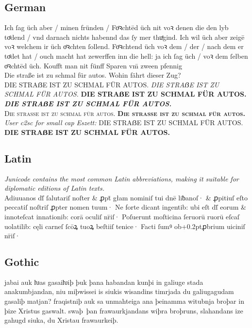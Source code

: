 \documentclass[12pt,a4paper,openany]{book}
\newcommand{\saltb}[1]{{\addfontfeatures{Alternate=1}{#1}}}
\begin{document}
\subsection*{German}

Ich ſag üch aber / minen fründen / Foͤꝛchtēd üch nit voꝛ denen die den
lyb toͤdend / vnd darnach nichts habennd das ſy mer thuͤgind. Ich wil
üch aber zeigē voꝛ welchem ir üch \saltb{f}oͤꝛchten ſollend. Foͤꝛchtend üch voꝛ
dem / der / nach dem er toͤdet hat / ouch macht hat zewerffen inn die
hell: ja ich ſag üch / voꝛ dem ſelben \saltb{f}oͤꝛchtēd üch. Koufft man nit
fünff Sparen vm̄ zween pfennig\\[1ex]
{\Large Die straße ist zu schmal für autos. Wohin fährt dieser Zug?}\\
DIE STRAẞE IST ZU SCHMAL FÜR AUTOS.
{\itshape DIE STRAẞE IST ZU SCHMAL FÜR AUTOS.}
{\bfseries DIE STRAẞE IST ZU SCHMAL FÜR AUTOS.}
{\itshape\bfseries DIE STRAẞE IST ZU SCHMAL FÜR AUTOS.}\\[1ex]
{\scshape Die straße ist zu schmal für autos.
\bfseries Die straße ist zu schmal für autos.}
{\itshape User c2sc for small cap Eszett:}
{DIE STRAẞE IST ZU SCHMAL FÜR AUTOS.
\bfseries DIE STRAẞE IST ZU SCHMAL FÜR AUTOS.}



\subsection*{Latin}

{\small\itshape Junicode contains the most common Latin abbreviations,
  making it suitable for diplomatic editions of Latin texts.}\\[1ex]
{Adiuuanos dſ̄ ſalutariſ noſter \&
 ꝓpt̄ głam nominiſ tui dnē liƀanoſ· \& ꝓpitiuſ eſto peccatiſ noſtriſ
 ꝓpter nomen tuum· Ne forte dicant ingentib: ubi eſt dſ̄ eorum \&
  innoteſcat innationib: corā oculiſ nr̄iſ· Poſuerunt moſticina
  ſeruorū ruorū eſcaſ uolatilib: cęli carneſ ſcōꝝ tuoꝝ beſtiiſ tenice·
  Facti ſumꝰ ob\kern+0.2ptꝓbrium uiciniſ nr̄iſ·}

\subsection*{Gothic}

jabai auk ƕas gasaiƕiþ þuk þana habandan kunþi in galiuge stada
anakumbjandan, niu miþwissei is siukis wis\-an\-dins timrjada du
galiugagudam gasaliþ matjan?  fraqistniþ auk sa unmahteiga ana
þeinamma witubnja broþar in þize Xristus gaswalt.  swaþ~þan
frawaurkjandans wiþra broþruns, slahandans ize gahugd siuka, du
Xristau fra\-waur\-keiþ.\\
\end{document}

